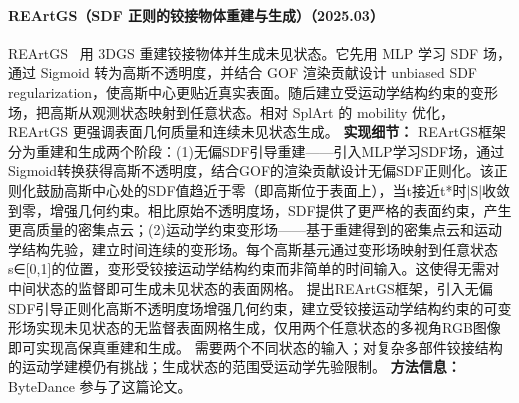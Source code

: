 \paragraph{REArtGS（SDF 正则的铰接物体重建与生成）（2025.03）}
REArtGS~\cite{2503_06677} 用 3DGS 重建铰接物体并生成未见状态。它先用 MLP 学习 SDF 场，通过 Sigmoid 转为高斯不透明度，并结合 GOF 渲染贡献设计 unbiased SDF regularization，使高斯中心更贴近真实表面。随后建立受运动学结构约束的变形场，把高斯从观测状态映射到任意状态。相对 SplArt 的 mobility 优化，REArtGS 更强调表面几何质量和连续未见状态生成。
\textbf{实现细节：} REArtGS框架分为重建和生成两个阶段：(1)无偏SDF引导重建——引入MLP学习SDF场，通过Sigmoid转换获得高斯不透明度，结合GOF的渲染贡献设计无偏SDF正则化。该正则化鼓励高斯中心处的SDF值趋近于零（即高斯位于表面上），当t接近t*时|S|收敛到零，增强几何约束。相比原始不透明度场，SDF提供了更严格的表面约束，产生更高质量的密集点云；(2)运动学约束变形场——基于重建得到的密集点云和运动学结构先验，建立时间连续的变形场。每个高斯基元通过变形场映射到任意状态s∈[0,1]的位置，变形受铰接运动学结构约束而非简单的时间输入。这使得无需对中间状态的监督即可生成未见状态的表面网格。 提出REArtGS框架，引入无偏SDF引导正则化高斯不透明度场增强几何约束，建立受铰接运动学结构约束的可变形场实现未见状态的无监督表面网格生成，仅用两个任意状态的多视角RGB图像即可实现高保真重建和生成。 需要两个不同状态的输入；对复杂多部件铰接结构的运动学建模仍有挑战；生成状态的范围受运动学先验限制。
\textbf{方法信息：} ByteDance 参与了这篇论文。



